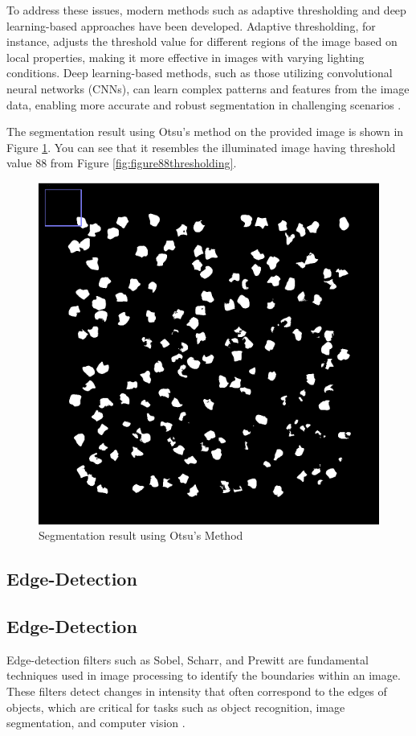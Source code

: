 \documentclass[%
	a4paper, %
	12pt, %
	english, %
	bibtotoc %
]{scrartcl}
\newcommand{\todo}[1]{{\color{blue}{TODO: {#1}}}}
\begin{document}
To address these issues, modern methods such as adaptive thresholding and deep learning-based approaches have been developed. Adaptive thresholding, for instance, adjusts the threshold value for different regions of the image based on local properties, making it more effective in images with varying lighting conditions. Deep learning-based methods, such as those utilizing convolutional neural networks (CNNs), can learn complex patterns and features from the image data, enabling more accurate and robust segmentation in challenging scenarios \cite{Otsu1979, Sezgin2004, Ronneberger2015}.

The segmentation result using Otsu's method on the provided image is shown in Figure \ref{fig:otsu_result}. You can see that it resembles the illuminated image having threshold value 88 from Figure \ref{fig:figure88thresholding}.

\begin{figure}[H]
    \centering
    \includegraphics[width=0.3\linewidth]{latex-template-ss24/images/Otsu_image.png}
    \caption{Segmentation result using Otsu's Method}
    \label{fig:otsu_result}
\end{figure}





\subsection{Edge-Detection}

\subsection{Edge-Detection}

Edge-detection filters such as Sobel, Scharr, and Prewitt are fundamental techniques used in image processing to identify the boundaries within an image. These filters detect changes in intensity that often correspond to the edges of objects, which are critical for tasks such as object recognition, image segmentation, and computer vision \cite{Gonzalez2008}.
\end{document}
